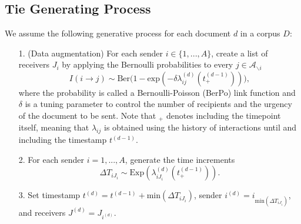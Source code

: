\documentclass[a4paper]{article}
\begin{document}
\subsection{Tie Generating Process}\label{subsec: Tie Generating Process}
We assume the following generative process for each document $d$ in a corpus $D$:
\begin{itemize}
	\item[1.] (Data augmentation) For each sender $i \in \{1,...,A\}$, create a list of receivers $J_i$ by applying the Bernoulli probabilities to every $j \in \mathcal{A}_{\backslash i}$
	\begin{equation} I(i \rightarrow j) \sim \mbox{Ber}\Big(1-\mbox{exp}(-\delta\lambda^{(d)}_{ij}(t_+^{(d-1)}))\Big),
	\end{equation}
	where the probability is called a Bernoulli-Poisson (BerPo) link function \citep{zhou2015infinite} and $\delta$ is a tuning parameter to control the number of recipients and the urgency of the document to be sent. Note that $_+$ denotes including the timepoint itself, meaning that $\lambda_{ij}$ is obtained using the history of interactions until and including the timestamp $t^{(d-1)}$. \iffalse (i.e. $\lambda^{(d)}_{ij}(t_+^{(d-1)})=\sum\limits_{c=1}^{C} p^{(d)}_c\cdot\mbox{exp}\Big\{\boldsymbol{b}^{(c)T}\boldsymbol{x}^{(c)}_{t^{(d-1)}_+}(i, j)\Big\}\cdot 1\{j \in \mathcal{A}_{\backslash i}\}$)\fi
	\item[2.] For each sender $i = 1,...,A$, generate the time increments \begin{equation}
\Delta T_{i{J_i}} \sim \mbox{Exp}(\lambda_{i{J_i}}^{(d)}(t_+^{(d-1)})).
	\end{equation}
\iffalse	where $\lambda^{(d)}_{i{J_i}}(t_+^{(d-1)})= \sum\limits_{c=1}^{C} p^{(d)}_c\cdot\mbox{exp}\Big\{\sum\limits_{j \in{J_i}}\boldsymbol{b}^{(c)T}\boldsymbol{x}^{(c)}_{t^{(d-1)}_+}(i, j)\Big\}\cdot \prod\limits_{j \in J_i}1\{j \in \mathcal{A}_{\backslash i}\}$\fi
	 	 \item[3.] Set timestamp $t^{(d)} = t^{(d-1)}+\mbox{min}(\Delta T_{i{J_i}})$, sender $i^{(d)} = i_{\mbox{min}(\Delta T_{i{J_i}})}$, and receivers $J^{(d)} = J_{i^{(d)}}$.
\end{itemize}
\end{document}
